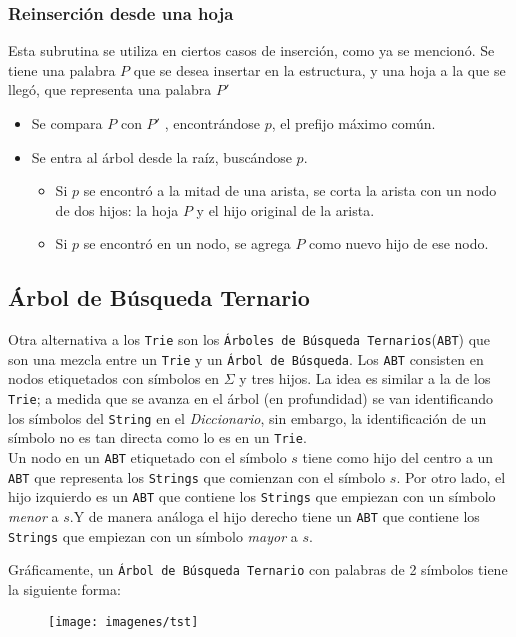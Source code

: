 \documentclass[dcc,uchile]{fcfmcourse}
\begin{document}
\subsubsection*{Reinserción desde una hoja}
Esta subrutina se utiliza en ciertos casos de inserción, como ya se mencionó. Se tiene una palabra $P$ que se desea insertar en la estructura, y una hoja a la que se llegó, que representa una palabra $P'$
\begin{itemize}
\item Se compara $P$ con $P'$ , encontrándose $p$, el prefijo máximo común.
\item Se entra al árbol desde la raíz, buscándose $p$.
\begin{itemize}
\item Si $p$ se encontró a la mitad de una arista, se corta la arista con un nodo de dos hijos: la hoja $P$ y el hijo original de la arista.
\item Si $p$ se encontró en un nodo, se agrega $P$ como nuevo hijo de ese nodo.
\end{itemize}
\end{itemize}
\subsection{Árbol de Búsqueda Ternario} 
Otra alternativa a los \texttt{Trie} son los \texttt{Árboles de Búsqueda Ternarios}(\texttt{ABT}) que son una mezcla entre un \texttt{Trie} y un \texttt{Árbol de Búsqueda}. Los \texttt{ABT} consisten en nodos etiquetados con símbolos en $\Sigma$ y tres hijos. La idea es similar a la de los \texttt{Trie}; a medida que se avanza en el árbol (en profundidad) se van identificando los símbolos del \texttt{String} en el \textit{Diccionario}, sin embargo, la identificación de un símbolo no es tan directa como lo es en un \texttt{Trie}.\\

Un nodo en un \texttt{ABT} etiquetado con el símbolo $s$ tiene como hijo del centro a un \texttt{ABT} que representa los \texttt{Strings} que comienzan con el símbolo $s$. Por otro lado, el hijo izquierdo es un \texttt{ABT} que contiene los \texttt{Strings} que empiezan con un símbolo \textit{menor} a $s$.Y de manera análoga el hijo derecho tiene un \texttt{ABT} que contiene los \texttt{Strings} que empiezan con un símbolo \textit{mayor} a $s$.
\newpage

Gráficamente, un \texttt{Árbol de Búsqueda Ternario} con palabras de 2 símbolos tiene la siguiente forma:
\begin{figure}[h]
\centering
\texttt{[image: imagenes/tst]}
\end{figure}
\end{document}
